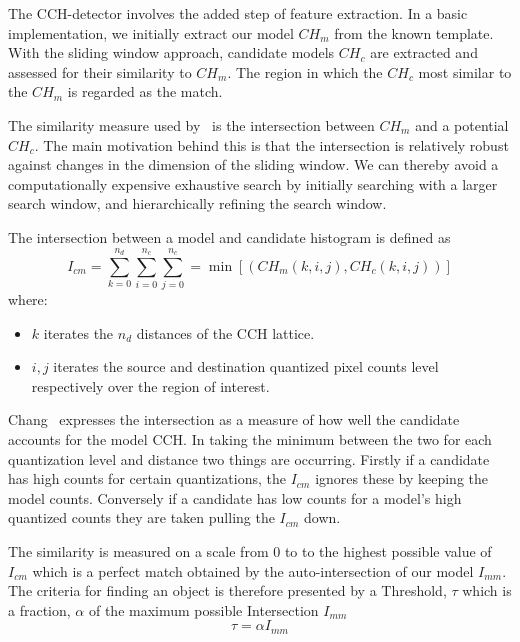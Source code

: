 The CCH-detector involves the added step of feature extraction. In a basic
implementation, we initially extract our model $CH_m$ from the known template.
With the sliding window approach, candidate models $CH_c$ are extracted and
assessed for their similarity to $CH_m$. The region in which the $CH_c$ most
similar to the $CH_m$ is regarded as the match. 

The similarity measure used by~\cite{Chang1999} is the 
intersection between $CH_m$ and a potential $CH_c$. The main motivation behind
this is that the intersection is relatively robust against changes in the
dimension of the sliding window.
We can thereby avoid a computationally expensive exhaustive search by initially
searching with a larger search window, and hierarchically refining the search
window.

The intersection between a model and candidate histogram is defined as
\begin{equation}\label{eqn:intersection}
    I_{cm} = \sum_{k=0}^{n_d}\sum_{i=0}^{n_c}\sum_{j=0}^{n_c} = \min[(CH_m(k,i,j),CH_c(k,i,j))]
\end{equation}
where:
\begin{itemize}
    \item $k$ iterates the $n_d$ distances of the CCH lattice.
    \item $i,j$ iterates the source and destination quantized pixel counts level respectively over the
        region of interest.
\end{itemize}

Chang~\cite{Chang1999} expresses the intersection as a measure of how well the
candidate accounts for the model CCH\@. In taking the minimum between the two
for each quantization level and distance two things are occurring. Firstly if a
candidate has high counts for certain quantizations, the $I_{cm}$ ignores these
by keeping the model counts. Conversely if a candidate has low counts for a
model's high quantized counts they are taken pulling the $I_{cm}$ down.

The similarity is measured on a scale from 0 to to the highest possible value of
$I_{cm}$ which is a perfect match obtained by the auto-intersection of our
model $I_{mm}$.
The criteria for finding an object is therefore presented by a Threshold, $\tau$ which
is a fraction, $\alpha$ of the maximum possible Intersection $I_{mm}$
\[\tau=\alpha I_{mm}\]


